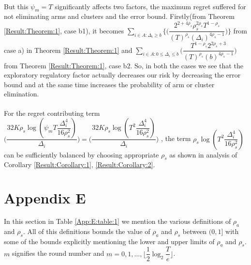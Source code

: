\paragraph*{} But this $\psi_{m}=T$ significantly affects two factors, the maximum regret suffered for not eliminating arms and clusters and the error bound. Firstly(from Theorem \ref{Result:Theorem:1}, case b1), it becomes $ \sum_{i\in A:\Delta_{i}\geq b}\bigg\lbrace\bigg(\dfrac{2^{2+4\rho_{s}}\rho_{s}^{2\rho_{s}}T^{1-\rho_{s}}}{(T)^{\rho_{s}}(\Delta_{i})^{4\rho_{s}-1}}\bigg)\bigg\rbrace$ from case a) in Theorem \ref{Result:Theorem:1} and $\sum_{i\in A:0\leq \Delta_{i}\leq b} \bigg(\dfrac{T^{1-\rho_{s}}2^{2\rho_{s}+3}}{(T)^{\rho_{s}}(b)^{4\rho_{s} -1}} \bigg)$ from Theorem \ref{Result:Theorem:1}, case b2. So, in both the cases we see that the exploratory regulatory factor actually decreases our risk by decreasing the error bound and at the same time increases the probability of arm or cluster elimination.
	
\paragraph*{} For the regret contributing term $\bigg(\dfrac{32K\rho_{s}\log{(\psi_{m}T\dfrac{\Delta_{i}^{4}}{16\rho_{s}^{2}})}}{\Delta_{i}}\bigg) = \bigg(\dfrac{32K\rho_{s}\log{(T^{2}\dfrac{\Delta_{i}^{4}}{16\rho_{s}^{2}})}}{\Delta_{i}}\bigg)$ , the term $\rho_{s}\log{(T^{2}\dfrac{\Delta_{i}^{4}}{16\rho_{s}^{2}})}$ can be sufficiently balanced by choosing appropriate $\rho_{s}$ as shown in analysis of Corollary \ref{Result:Corollary:1}, \ref{Result:Corollary:2}.

\section{Appendix E}
\label{App:E}
In this section in Table \ref{App:E:table:1} we mention the various definitions of $\rho_{a}$ and $\rho_{s}$. All of this definitions bounds the value of $\rho_{a}$ and $\rho_{s}$ between $(0,1]$ with some of the bounds explicitly mentioning the lower and upper limits of $\rho_{a}$ and $\rho_{s}$. $m$ signifies the round number and $m=0,1,...,\big \lfloor \dfrac{1}{2}\log_{2} \dfrac{T}{e}\big\rfloor$.


